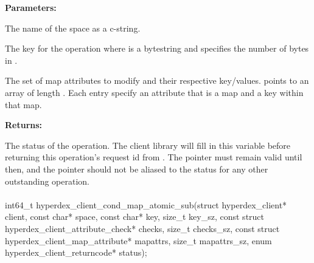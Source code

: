 \noindent\textbf{Parameters:}
\begin{description}[labelindent=\widthof{{\code{mapattrs}, \code{mapattrs\_sz}}},leftmargin=*,noitemsep,nolistsep,align=right]
\item[\code{space}] The name of the space as a c-string.
\item[\code{key}, \code{key\_sz}] The key for the operation where  is a bytestring and  specifies the number of bytes in .
\item[\code{mapattrs}, \code{mapattrs\_sz}] The set of map attributes to modify and their respective key/values.   points to an array of length .  Each entry specify an attribute that is a map and a key within that map.
\end{description}

\noindent\textbf{Returns:}
\begin{description}[labelindent=\widthof{{\code{status}}},leftmargin=*,noitemsep,nolistsep,align=right]
\item[\code{status}] The status of the operation.  The client library will fill in this variable before returning this operation's request id from .  The pointer must remain valid until then, and the pointer should not be aliased to the status for any other outstanding operation.
\end{description}

\paragraph{}
\label{api:c:cond_map_atomic_sub}
\begin{ccode}
int64_t hyperdex_client_cond_map_atomic_sub(struct hyperdex_client* client,
                const char* space,
                const char* key, size_t key_sz,
                const struct hyperdex_client_attribute_check* checks, size_t checks_sz,
                const struct hyperdex_client_map_attribute* mapattrs, size_t mapattrs_sz,
                enum hyperdex_client_returncode* status);
\end{ccode}
\funcdesc 

